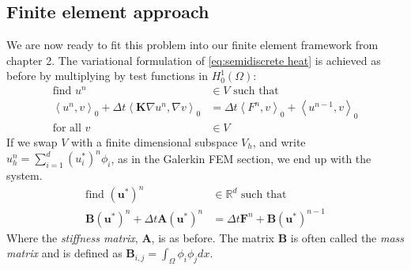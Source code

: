 \documentclass[../Main/main.tex]{subfiles}
\begin{document}
	\subsection*{Finite element approach}
	We are now ready to fit this problem into our finite element framework from chapter 2.
	The variational formulation of \eqref{eq:semidiscrete heat} is achieved as before by multiplying by test functions in $H^1_0(\Omega)$:
	\begin{equation}
		\begin{aligned}
			\text{find }u^n&\in V \text{ such that }\\
			\left \langle  u^n, v\right \rangle_0 + \Delta t \left \langle  \pmb{K} \nabla u^n, \nabla v \right \rangle_0 &=\Delta t \left \langle F^n,v\right \rangle_0 + \left \langle u^{n-1},v \right \rangle_0\\
			\text{for all }v&\in V
		\end{aligned}
	\end{equation}
	If we swap $V$ with  a finite dimensional subspace $V_h$, and write $u_h^n = \sum_{i = 1}^d (u_i^*)^n \phi_i $, as in the Galerkin FEM section, we end up with the system.
	\begin{equation}\label{eq:heat fem disc}
		\begin{aligned}
			\text{find }(\pmb{u}^*)^n&\in \mathbb{R}^d \text{ such that }\\
			\pmb{B}(\pmb{u}^*)^n+\Delta t\pmb{A}(\pmb{u}^*)^n &=\Delta t \pmb{F}^n +  \pmb{B}(\pmb{u}^*)^{n-1}
		\end{aligned}
	\end{equation}
	Where the \emph{stiffness matrix}, $\pmb{A}$, is as before. The matrix $\pmb{B}$ is often called the \emph{mass matrix} and is defined as $\pmb{B}_{i,j} = \int_{\Omega} \phi_i \phi_jdx$.
\end{document}
